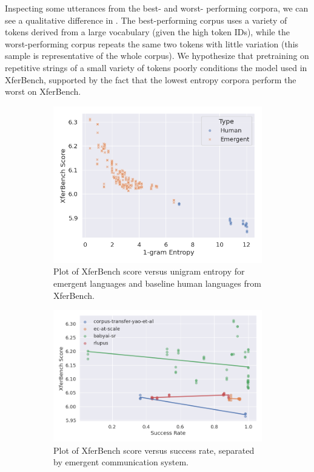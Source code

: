 Inspecting some utterances from the best- and worst- performing corpora, we can see a qualitative difference in .
The best-performing corpus uses a variety of tokens derived from a large vocabulary (given the high token IDs), while the worst-performing corpus repeats the same two tokens with little variation (this sample is representative of the whole corpus).
We hypothesize that pretraining on repetitive strings of a small variety of tokens poorly conditions the model used in XferBench, supported by the fact that the lowest entropy corpora perform the worst on XferBench.

\begin{figure}
  \centering
  \hfill
  \begin{subfigure}{0.45\linewidth}
    \centering
    \includegraphics[width=\linewidth]{chapters/elcc/src/figure/generated/entropy-scatter}
    \caption{Plot of XferBench score versus unigram entropy for emergent languages and baseline human languages from XferBench.}
  \end{subfigure}
  \hfill
  \begin{subfigure}{0.45\linewidth}
    \centering
    \includegraphics[width=\linewidth]{chapters/elcc/src/figure/generated/success-scatter}
    \caption{Plot of XferBench score versus success rate, separated by emergent communication system.}
  \end{subfigure}
  \hfill
  \caption{}
  \label{elcc:fig:scatter}
\end{figure}

